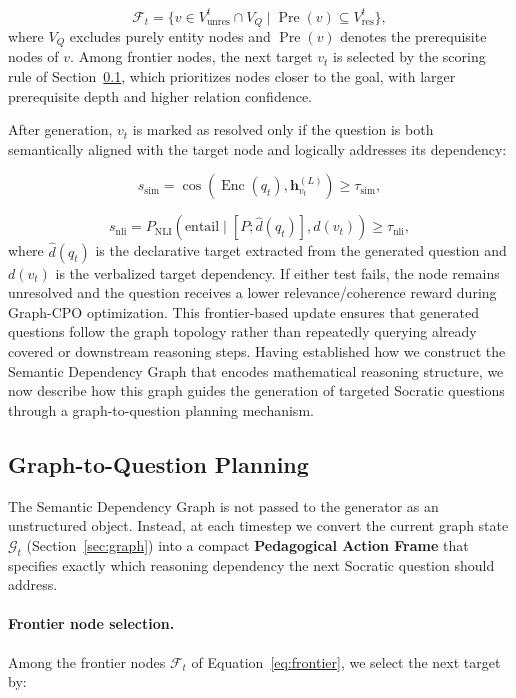 \documentclass[sigconf, anonymous, review, screen]{acmart}
\begin{document}
\begin{equation}
\mathcal{F}_t =
\{v\in V^t_{\mathrm{unres}}\cap V_Q
\mid \operatorname{Pre}(v)\subseteq V^t_{\mathrm{res}}\},
\label{eq:frontier}
\end{equation}
where $V_Q$ excludes purely entity nodes and $\operatorname{Pre}(v)$ denotes the prerequisite nodes of
$v$. Among frontier nodes, the next target $v_t$ is selected by the scoring rule of
Section~\ref{sec:g2q}, which prioritizes nodes closer to the goal, with larger prerequisite depth and
higher relation confidence.

After generation, $v_t$ is marked as resolved only if the question is both semantically aligned with
the target node and logically addresses its dependency:

\[
s_{\mathrm{sim}}=\cos(\operatorname{Enc}(q_t),\mathbf{h}^{(L)}_{v_t})\ge \tau_{\mathrm{sim}},
\]

\[
s_{\mathrm{nli}}=
P_{\mathrm{NLI}}(\mathrm{entail}\mid [P;\hat d(q_t)],d(v_t))
\ge \tau_{\mathrm{nli}},
\]
where $\hat d(q_t)$ is the declarative target extracted from the generated question and $d(v_t)$ is the verbalized target dependency. If either test fails, the node remains unresolved and the question receives a lower relevance/coherence reward during Graph-CPO optimization. This frontier-based update ensures that generated questions follow the graph topology rather than repeatedly querying already covered or downstream reasoning steps. Having established how we construct the Semantic Dependency Graph that encodes mathematical reasoning structure, we now describe how this graph guides the generation of targeted Socratic questions through a graph-to-question planning mechanism.



\subsection{Graph-to-Question Planning}
\label{sec:g2q}

The Semantic Dependency Graph is not passed to the generator as an unstructured object. Instead, at each timestep we convert the current graph state $\mathcal{G}_t$ (Section~\ref{sec:graph}) into a compact \textbf{Pedagogical Action Frame} that specifies exactly which reasoning dependency the next Socratic question should address.

\paragraph{Frontier node selection.}
Among the frontier nodes $\mathcal{F}_t$ of Equation~\eqref{eq:frontier}, we select the next target by:
\end{document}
